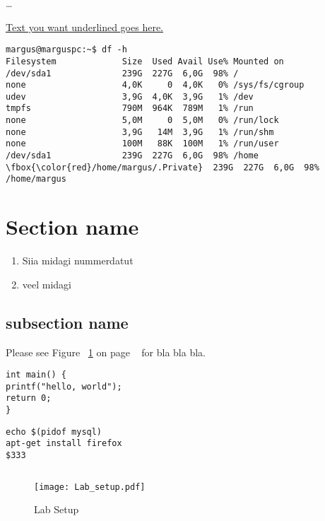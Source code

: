 \ldots
{}


\underline{Text you want underlined goes here.}




\begin{Verbatim}[frame=single,
label=Command output,framesep=2mm,rulecolor=\color{red},commandchars=\\\{\}]
margus@marguspc:~$ df -h
Filesystem             Size  Used Avail Use% Mounted on
/dev/sda1              239G  227G  6,0G  98% /
none                   4,0K     0  4,0K   0% /sys/fs/cgroup
udev                   3,9G  4,0K  3,9G   1% /dev
tmpfs                  790M  964K  789M   1% /run
none                   5,0M     0  5,0M   0% /run/lock
none                   3,9G   14M  3,9G   1% /run/shm
none                   100M   88K  100M   1% /run/user
/dev/sda1              239G  227G  6,0G  98% /home
\fbox{\color{red}/home/margus/.Private}  239G  227G  6,0G  98% /home/margus
\end{Verbatim}



\section{Section name}
\begin{enumerate}
	\item Siia midagi nummerdatut
	\item veel midagi
\end{enumerate}
\subsection{subsection name}
Please see Figure ~\ref{Lab Setup} on page ~\pageref{Lab Setup} for bla bla bla.

\begin{verbatim}
int main() {
printf("hello, world");
return 0;
}
\end{verbatim}
\begin{verbatim}
echo $(pidof mysql)
apt-get install firefox
$333
\end{verbatim}
\inputminted{sh}{code/simple.sh}

\begin{figure}
    \centering
	\texttt{[image: Lab\_setup.pdf]}
	\caption{Lab Setup}
	\label{Lab Setup}
\end{figure}





